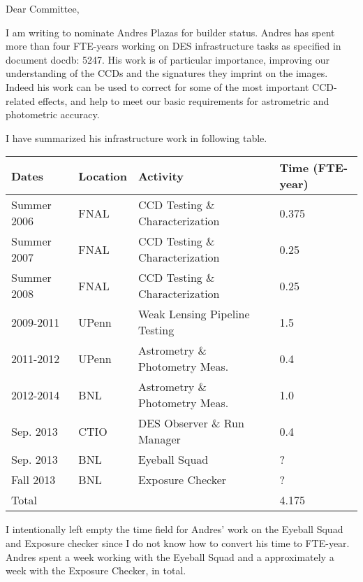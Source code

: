 \documentclass[12pt]{letter}
\begin{document}
\begin{letter}{}

\opening{Dear Committee,}

I am writing to nominate Andres Plazas for builder status.  Andres has spent
more than four FTE-years working on DES infrastructure tasks as specified in document
docdb: 5247. His work is of particular importance, improving our understanding
of the CCDs and the signatures they imprint on the images.  Indeed his work
can be used to correct for some of the most important CCD-related effects,
and help to meet our basic requirements for astrometric and photometric accuracy.

I have summarized his infrastructure work in following table.

\begin{tabular}{|l|l|l|l|}
    \hline
    Dates              & Location & Activity                         & Time (FTE-year) \\ \hline \hline
    Summer 2006     & FNAL     & CCD Testing \& Characterization  & 0.375 \\
    Summer 2007     & FNAL     & CCD Testing \& Characterization  & 0.25  \\
    Summer 2008     & FNAL     & CCD Testing \& Characterization  & 0.25  \\
    \hline
    2009-2011          & UPenn    & Weak Lensing Pipeline Testing    & 1.5 \\
    \hline
    2011-2012          & UPenn    & Astrometry \& Photometry Meas. & 0.4 \\
    2012-2014          & BNL      & Astrometry \& Photometry Meas. & 1.0 \\
    \hline
    Sep. 2013          & CTIO     & DES Observer \& Run Manager      & 0.4 \\
    \hline 
    Sep. 2013          & BNL      & Eyeball Squad                    & ? \\
    \hline 
    Fall 2013          & BNL      & Exposure Checker                 & ? \\
    \hline
    \hline
    Total              &          &                                  & 4.175 \\
    \hline
\end{tabular}

I intentionally left empty the time field for Andres' work on the Eyeball Squad
and Exposure checker since I do not know how to convert his time to FTE-year.
Andres spent a week working with the Eyeball Squad and a approximately a week
with the Exposure Checker, in total.


\end{letter}
\end{document}
